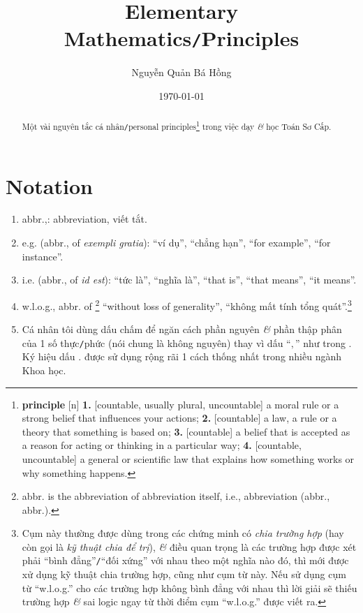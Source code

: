 \documentclass{article}
\title{Elementary Mathematics\texttt{/}Principles}
\author{Nguyễn Quản Bá Hồng}
\date{\today}
\numberwithin{equation}{section}
\begin{document}
\maketitle
\begin{abstract}
	Một vài nguyên tắc cá nhân\texttt{/}personal principles\footnote{\textbf{principle} [n] \textbf{1.} [countable, usually plural, uncountable] a moral rule or a strong belief that influences your actions; \textbf{2.} [countable] a law, a rule or a theory that something is based on; \textbf{3.} [countable] a belief that is accepted as a reason for acting or thinking in a particular way; \textbf{4.} [countable, uncountable] a general or scientific law that explains how something works or why something happens.} trong việc dạy \textit{\&} học Toán Sơ Cấp.
\end{abstract}
\tableofcontents


\section{Notation}

\begin{enumerate}
	\item abbr.,: abbreviation, viết tắt.
	\item e.g. (abbr., of \textit{exempli gratia}): ``ví dụ'', ``chẳng hạn'', ``for example'', ``for instance''.
	\item i.e. (abbr., of \textit{id est}): ``tức là'', ``nghĩa là'', ``that is'', ``that means'', ``it means''.
	\item w.l.o.g., abbr. of \footnote{abbr. is the abbreviation of abbreviation itself, i.e., abbreviation (abbr., abbr.).} ``without loss of generality'', ``không mất tính tổng quát''.\footnote{Cụm này thường được dùng trong các chứng minh có \textit{chia trường hợp} (hay còn gọi là \textit{kỹ thuật chia để trị}), \textit{\&} điều quan trọng là các trường hợp được xét phải ``bình đẳng''\texttt{/}``đối xứng'' với nhau theo một nghĩa nào đó, thì mới được xử dụng kỹ thuật chia trường hợp, cũng như cụm từ này. Nếu sử dụng cụm từ ``w.l.o.g.'' cho các trường hợp không bình đẳng với nhau thì lời giải sẽ thiếu trường hợp \textit{\&} sai logic ngay từ thời điểm cụm ``w.l.o.g.'' được viết ra.}
	\item Cá nhân tôi dùng dấu chấm để ngăn cách phần nguyên \textit{\&} phần thập phân của 1 số thực\texttt{/}phức (nói chung là không nguyên) thay vì dấu ``$,$'' như trong \cite{Thai_Anh_Dat_Ha_Loan_Nam_Quang_Toan_6_tap_1, Thai_Anh_Dat_Ha_Loan_Nam_Quang_Toan_6_tap_2}. Ký hiệu dấu $.$ được sử dụng rộng rãi 1 cách thống nhất trong nhiều ngành Khoa học.
\end{enumerate}
\end{document}
